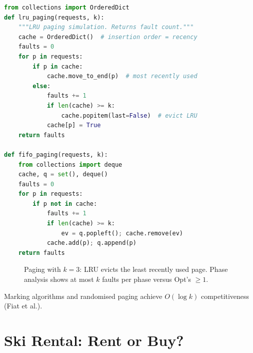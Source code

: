 \begin{lstlisting}[language=Python]
from collections import OrderedDict
def lru_paging(requests, k):
    """LRU paging simulation. Returns fault count."""
    cache = OrderedDict()  # insertion order = recency
    faults = 0
    for p in requests:
        if p in cache:
            cache.move_to_end(p)  # most recently used
        else:
            faults += 1
            if len(cache) >= k:
                cache.popitem(last=False)  # evict LRU
            cache[p] = True
    return faults

def fifo_paging(requests, k):
    from collections import deque
    cache, q = set(), deque()
    faults = 0
    for p in requests:
        if p not in cache:
            faults += 1
            if len(cache) >= k:
                ev = q.popleft(); cache.remove(ev)
            cache.add(p); q.append(p)
    return faults
\end{lstlisting}

\begin{figure}[h]\centering
{}
\caption{Paging with $k=3$: LRU evicts the least recently used page. Phase analysis shows at most $k$ faults per phase versus Opt's $\ge1$.}
\label{fig:paging}
\end{figure}

Marking algorithms and randomised paging achieve $O(\log k)$ competitiveness (Fiat et al.).

\section{Ski Rental: Rent or Buy?}
\label{sec:ski-rental}


